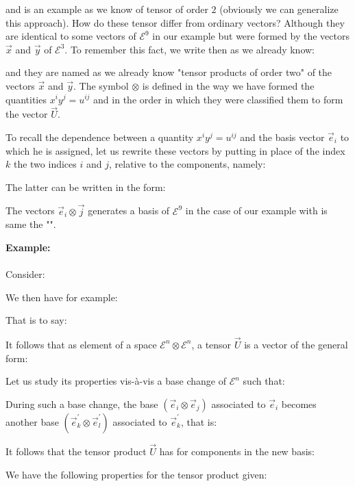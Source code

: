 	and is an example as we know of tensor of order $2$ (obviously we can generalize this approach).
	How do these tensor differ from ordinary vectors? Although they are identical to some vectors of $\mathcal{E}^9$ in our example but were formed by the vectors $\vec{x}$ and $\vec{y}$ of $\mathcal{E}^3$. To remember this fact, we write then as we already know:
	
	and they are named as we already know "tensor products of order two" of the vectors $\vec{x}$ and $\vec{y}$. The symbol $\otimes$ is defined in the way we have formed the quantities $x^iy^j=u^{ij}$ and in the order in which they were classified them to form the vector $\vec{U}$.

	To recall the dependence between a quantity $x^iy^j=u^{ij}$ and the basis vector $\vec{e}_i$ to which he is assigned, let us rewrite these vectors by putting in place of the index $k$ the two indices $i$ and $j$, relative to the components, namely:
	
	The latter can be written in the form:
	
	The vectors $\vec{e}_i\otimes\vec{j}$ generates a basis of $\mathcal{E}^9$ in the case of our example with is same the "".
	\begin{tcolorbox}[colframe=black,colback=white,sharp corners]
	\textbf{{\Large {}}Example:}\\\\
	Consider:
	
	We then have for example:
	
	That is to say:
	
	\end{tcolorbox}
	It follows that as element of a space $\mathcal{E}^n\otimes \mathcal{E}^n$, a tensor $\vec{U}$ is a vector of the general form:
	
	Let us study its properties vis-à-vis a base change of $\mathcal{E}^n$ such that:
	
	During such a base change, the base $(\vec{e}_i\otimes\vec{e}_j)$ associated to $\vec{e}_i$  becomes another base $(\vec{e}_k^{\prime}\otimes\vec{e}_l^{\prime})$ associated to $\vec{e}_k^{\prime}$, that is:
	
	It follows that the tensor product $\vec{U}$ has for components in the new basis:
	
	We have the following properties for the tensor product given:
	
